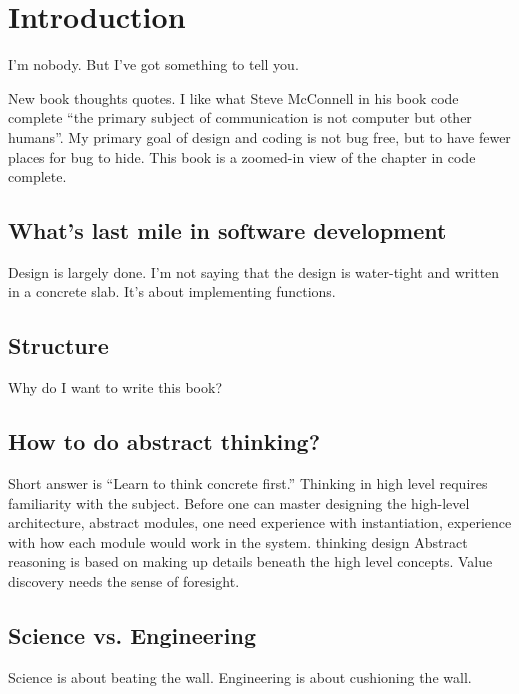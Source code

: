 \chapter{Introduction}

I'm nobody. But I've got something to tell you.

New book thoughts quotes.
I like what Steve McConnell in his book code complete “the primary subject of communication is
not computer but other humans”. My primary goal of design and coding is not bug free, but to have
fewer places for bug to hide. This book is a zoomed-in view of the chapter in code complete.

\section{What's last mile in software development}
Design is largely done. I'm not saying that the design is water-tight and written in a concrete
slab. It's about implementing functions.
\section{Structure}

Why do I want to write this book?

\section{How to do abstract thinking?}
Short answer is ``Learn to think concrete first.'' Thinking in high
level requires familiarity with the subject. Before one can master designing the high-level
architecture, abstract modules, one need experience with instantiation, experience with how each
module would work in the system. thinking design Abstract reasoning is based on making up details
beneath the high level concepts. Value discovery needs the sense of foresight.

\section{Science vs. Engineering}
Science is about beating the wall. Engineering is about cushioning the wall.

